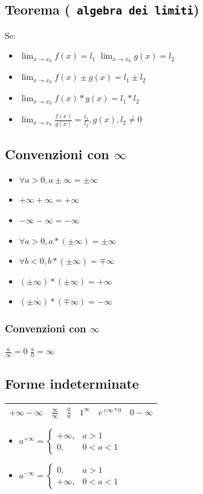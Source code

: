 \subsection{Teorema (\texttt{\color{red} algebra dei limiti})}
Se:
\begin{itemize}
	\item $\lim_{x\to x_0} f(x)=l_1$ $\lim_{x\to x_0} g(x) = l_2$
	\item $\lim_{x\to x_0} f(x)\pm g(x)=l_1\pm l_2$
	\item $\lim_{x\to x_0} f(x)*g(x)=l_1*l_2$
	\item $\lim_{x\to x_0} \frac{f(x)}{g(x)}=\frac{l_1}{l_2}, g(x), l_2\neq 0$

\end{itemize}
\subsection{Convenzioni con $\infty$}
\begin{itemize}
	\item $\forall a >0, a\pm \infty=\pm \infty$
	\item $+\infty+\infty=+\infty$
	\item $-\infty-\infty=-\infty$
	\item $\forall a> 0, a*(\pm \infty)=\pm \infty$
	\item $\forall b< 0, b*(\pm \infty)=\mp \infty$
	\item $(\pm\infty)*(\pm \infty)=+\infty$
	\item $(\pm\infty)*(\mp \infty)=-\infty$

\end{itemize}
\subsubsection{Convenzioni con $\infty$}
$\frac{a}{\infty}=0$ $\frac{a}{0}=\infty$

\subsection{Forme indeterminate}
\begin{tabular}{|llllll|}
	\hline
	$+\infty-\infty$&$\frac{\infty}{\infty}$&$\frac{0}{0}$&$1^\infty$&$e^{+\infty*0}$&$0-\infty$\\
	\hline
\end{tabular}
\begin{itemize}
	\item $a^{+\infty}=\begin{cases}
			+\infty,&a>1\\
			0,&0<a<1
	\end{cases}$
	\item $a^{-\infty}=\begin{cases}
			0,&a>1\\
			+\infty,&0<a<1
	\end{cases}$
\end{itemize}
